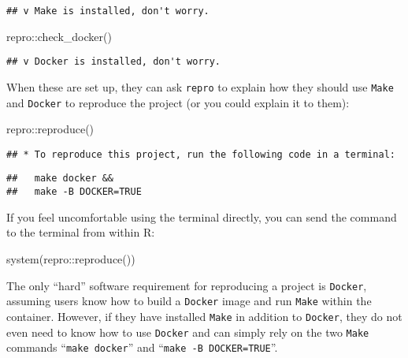 \documentclass[psych,tutorial,submit,moreauthors,pdftex]{mdpi}
\newenvironment{Shaded}{\begin{snugshade}}{\end{snugshade}}
\newcommand{\FunctionTok}[1]{\textcolor[rgb]{0.00,0.00,0.00}{#1}}
\newcommand{\NormalTok}[1]{#1}
\newcommand{\SpecialCharTok}[1]{\textcolor[rgb]{0.00,0.00,0.00}{#1}}
\begin{document}
\begin{verbatim}
## v Make is installed, don't worry.
\end{verbatim}

\begin{Shaded}
\begin{Highlighting}[]
\NormalTok{repro}\SpecialCharTok{::}\FunctionTok{check\_docker}\NormalTok{()}
\end{Highlighting}
\end{Shaded}

\begin{verbatim}
## v Docker is installed, don't worry.
\end{verbatim}

When these are set up, they can ask \texttt{repro} to explain how they
should use \texttt{Make} and \texttt{Docker} to reproduce the project
(or you could explain it to them):

\begin{Shaded}
\begin{Highlighting}[]
\NormalTok{repro}\SpecialCharTok{::}\FunctionTok{reproduce}\NormalTok{()}
\end{Highlighting}
\end{Shaded}

\begin{verbatim}
## * To reproduce this project, run the following code in a terminal:
\end{verbatim}

\begin{verbatim}
##   make docker &&
##   make -B DOCKER=TRUE
\end{verbatim}

If you feel uncomfortable using the terminal directly, you can send the
command to the terminal from within R:

\begin{Shaded}
\begin{Highlighting}[]
\FunctionTok{system}\NormalTok{(repro}\SpecialCharTok{::}\FunctionTok{reproduce}\NormalTok{())}
\end{Highlighting}
\end{Shaded}

The only ``hard'' software requirement for reproducing a project is
\texttt{Docker}, assuming users know how to build a \texttt{Docker}
image and run \texttt{Make} within the container. However, if they have
installed \texttt{Make} in addition to \texttt{Docker}, they do not even
need to know how to use \texttt{Docker} and can simply rely on the two
\texttt{Make} commands ``\texttt{make\ docker}'' and
``\texttt{make\ -B\ DOCKER=TRUE}''.
\end{document}
